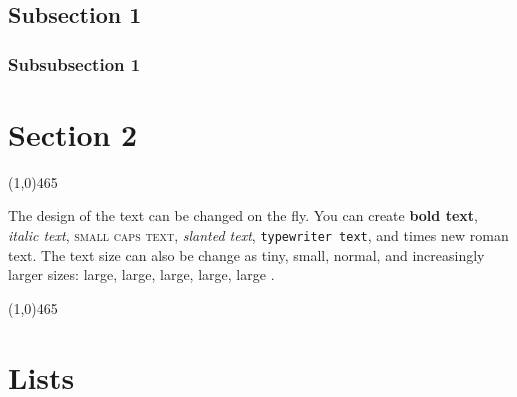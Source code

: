 \documentclass[12pt]{article}
\newenvironment{tightcenter}{%
  \setlength\topsep{0pt}
  \setlength\parskip{0pt}
  \begin{center}
}{%
  \end{center}
}
\begin{document}
\subsection*{Subsection 1}
\subsubsection*{Subsubsection 1}
\section*{Section 2}

\begin{tightcenter}
\line(1,0){465}
\end{tightcenter}

The design of the text can be changed on the fly. You can create \textbf{bold text}, \textit{italic text}, \textsc{small caps text}, \textsl{slanted text}, \texttt{typewriter text}, and \textrm{times new roman text}. The text size can also be change as \tiny{tiny}, \small{small}, normal, and increasingly larger sizes: \large{large}, \Large{large}, \LARGE{large}, \huge{large}, \Huge{large} \normalsize{.}

\begin{tightcenter}
\line(1,0){465}
\end{tightcenter}
\newpage



\section*{Lists}
\end{document}
